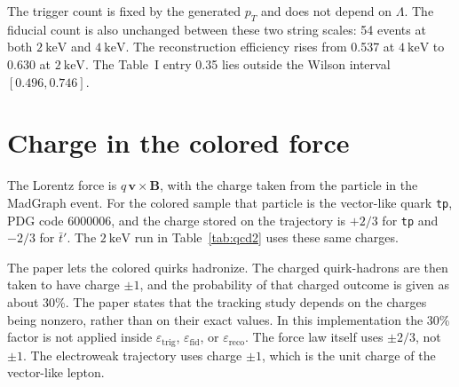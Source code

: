 \documentclass[11pt,a4paper]{article}
\begin{document}
The trigger count is fixed by the generated \(p_T\) and does not depend on \(\Lambda\).
The fiducial count is also unchanged between these two string scales: 54 events at both \(\SI{2}{\keV}\) and \(\SI{4}{\keV}\).
The reconstruction efficiency rises from 0.537 at \(\SI{4}{\keV}\) to 0.630 at \(\SI{2}{\keV}\).
The Table~I entry 0.35 lies outside the Wilson interval \([0.496, 0.746]\).

\section{Charge in the colored force}
The Lorentz force is \(q\,\mathbf{v}\times\mathbf{B}\), with the charge taken from the particle in the MadGraph event.
For the colored sample that particle is the vector-like quark \texttt{tp}, PDG code 6000006, and the charge stored on the trajectory is \(+2/3\) for \texttt{tp} and \(-2/3\) for \(\bar t'\).
The \(\SI{2}{\keV}\) run in Table~\ref{tab:qcd2} uses these same charges.

The paper lets the colored quirks hadronize.
The charged quirk-hadrons are then taken to have charge \(\pm 1\), and the probability of that charged outcome is given as about 30\%.
The paper states that the tracking study depends on the charges being nonzero, rather than on their exact values.
In this implementation the 30\% factor is not applied inside \(\varepsilon_{\mathrm{trig}}\), \(\varepsilon_{\mathrm{fid}}\), or \(\varepsilon_{\mathrm{reco}}\).
The force law itself uses \(\pm 2/3\), not \(\pm 1\).
The electroweak trajectory uses charge \(\pm 1\), which is the unit charge of the vector-like lepton.
\end{document}
